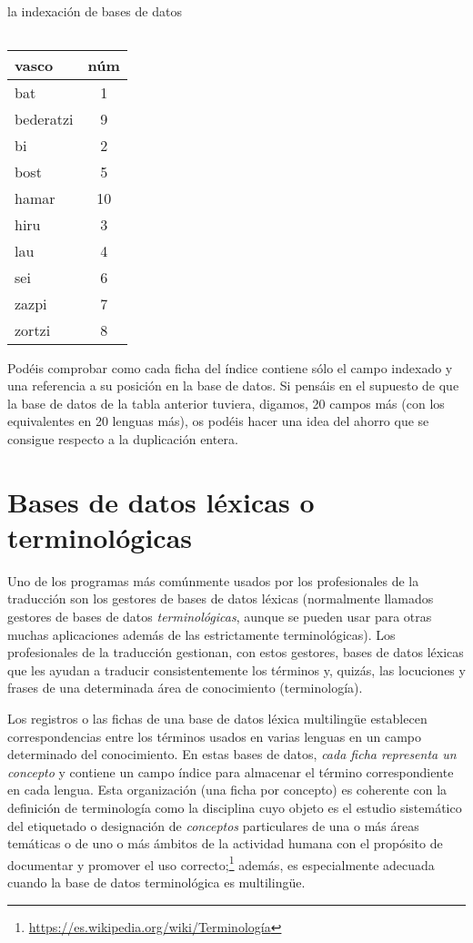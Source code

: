 \begin{persabermes}{la indexación de bases de datos}
\begin{center}
{\begin{tabular}{lc}
\end{tabular}} \hspace{0.2\textwidth} \parbox{0.25\textwidth}{ \begin{tabular}{lc} \hline

{\sc vasco\phantom{o-croat}} &{\sc núm} \\ \hline

\hline

bat &1 \\ bederatzi &9 \\ bi &2 \\ bost &5 \\ hamar &10 \\ hiru &3 \\ lau &4 \\ sei &6 \\ zazpi &7 \\ zortzi &8 \\ \hline

\end{tabular}} \end{center} Podéis comprobar como cada ficha del índice contiene sólo el campo indexado y una referencia a su posición en la base de datos. Si pensáis en el supuesto de que la base de datos de la tabla anterior tuviera, digamos, 20 campos más (con los equivalentes en 20 lenguas más), os podéis hacer una idea del ahorro que se consigue respecto a la duplicación entera. \end{persabermes} 

%
\section{Bases de datos léxicas o terminológicas} \label{ss:bdterm} 

Uno de los programas más comúnmente usados por los profesionales de la traducción son los gestores de bases de datos léxicas (normalmente llamados gestores de bases de datos \emph{terminológicas}, aunque se pueden usar para otras muchas aplicaciones además de las estrictamente terminológicas). Los profesionales de la traducción gestionan, con estos gestores, bases de datos léxicas que les ayudan a traducir consistentemente los términos y, quizás, las locuciones y frases de una determinada área de conocimiento (terminología). 

Los registros o las fichas de una base de datos léxica multilingüe establecen correspondencias entre los términos usados en varias lenguas en un campo determinado del conocimiento. En estas bases de datos, \emph{cada ficha representa un concepto} y contiene un campo índice para almacenar el término correspondiente en cada lengua. Esta organización (una ficha por concepto) es coherente con la definición de terminología como la disciplina cuyo objeto es el estudio sistemático del etiquetado o designación de \emph{conceptos} particulares de una o más áreas temáticas o de uno o más ámbitos de la actividad humana con el propósito de documentar y promover el uso correcto;\footnote{\url{https://es.wikipedia.org/wiki/Terminología}} además, es especialmente adecuada cuando la base de datos terminológica es multilingüe. 

